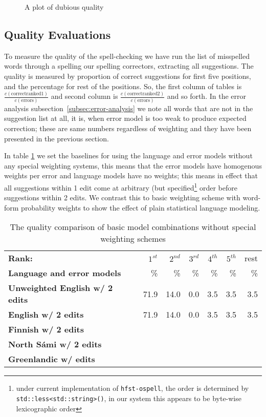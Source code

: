 \documentclass[a4paper,12pt]{article}
\begin{document}
\begin{figure}
    \centering
    \caption{A plot of dubious quality
    \label{fig:coverage}}
\end{figure}

\subsection{Quality Evaluations}

To measure the quality of the spell-checking we have run the list of misspelled
words through a spelling our spelling correctors, extracting all suggestions.
The quality is measured by proportion of correct suggestions for first five
positions, and the percentage for rest of the positions. So, the first column
of tables is $\frac{c(\mathrm{correct ranked 1})}{c(\mathrm{errors})}$ and
second column is $\frac{c(\mathrm{correct ranked 2})}{c(\mathrm{errors})}$ and
so forth.  In the error analysis subsection~\ref{subsec:error-analysis} we note
all words that are not in the suggestion list at all, it is, when error model
is too weak to produce expected correction; these are same numbers regardless
of weighting and they have been presented in the previous section.

In table \ref{table:baseline-quality} we set the baselines for using the
language and error models without any special weighting systems, this means
that the error models have homogenous weights per error and language models
have no weights; this means in effect that all suggestions within 1 edit come
at arbitrary (but specified\footnote{under current implementation of
    \texttt{hfst-ospell}, the order is determined by
    \texttt{std::less<std::string>()}, in our system this appears to be
byte-wise lexicographic order} order before suggestions within 2 edits.  We
contrast this to basic weighting scheme with word-form probability weights to
show the effect of plain statistical language modeling.

\begin{table}
    \centering
    \begin{tabular}{|l|r|r|r|r|r|r|}
        \hline
        \bf Rank: & $1^{st}$ & $2^{nd}$ & $3^{rd}$ & $4^{th}$ & $5^{th}$ & rest \\
        \bf Language and error models &  \% & \% & \% & \% & \% & \% \\
        \hline
\bf Unweighted English w/ 2 edits & 71.9 & 14.0 & 0.0 & 3.5 & 3.5 & 3.5 \\
        \bf English w/ 2 edits & 71.9 & 14.0 & 0.0 & 3.5 & 3.5 & 3.5 \\
        \hline
        \bf Finnish w/ 2 edits & & & & & \\
        \hline
        \bf North Sámi w/ 2 edits & & & & & \\
        \hline
        \bf Greenlandic w/ edits & & & & & \\
        \hline
    \end{tabular}
    \caption{The quality comparison of basic model combinations without special
    weighting schemes\label{table:baseline-quality}}
\end{table}
\end{document}
